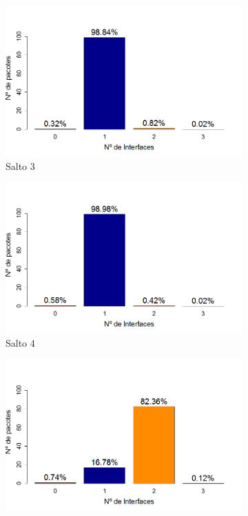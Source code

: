 \documentclass[
	12pt,				%
	openright,			%
	oneside,
	a4paper,			%
	english,			%
	french,				%
	spanish,			%
	brazil				%
	]{abntex2}
\begin{document}
\begin{figure}[htb]
\begin{subfigure}{.5\textwidth}
		\centering
		\includegraphics[width=.98\linewidth]{DRP_OPT_Salto3}
		\captionsetup{width=.9\textwidth}
		\caption{Salto 3}
		\label{dpr_opt_s3}
	\end{subfigure}%
	\begin{subfigure}{.5\textwidth}
		\centering
		\includegraphics[width=.98\linewidth]{DRP_OPT_Salto4}
		\captionsetup{width=.9\textwidth}
		\caption{Salto 4}
		\label{dpr_opt_s4}
	\end{subfigure}
	\begin{subfigure}{.5\textwidth}
		\centering
		\includegraphics[width=.98\linewidth]{DRP_OPT_Salto5}

\end{subfigure}
\end{figure}
\end{document}
